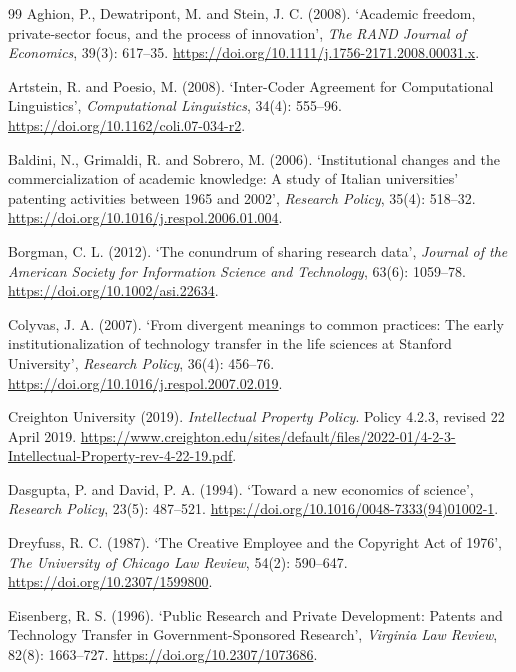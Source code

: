 \begin{thebibliography}{99}
 Aghion, P., Dewatripont, M. and Stein, J. C. (2008). `Academic freedom, private-sector focus, and the process of innovation', \emph{The RAND Journal of Economics}, 39(3): 617--35. \url{https://doi.org/10.1111/j.1756-2171.2008.00031.x}.

 Artstein, R. and Poesio, M. (2008). `Inter-Coder Agreement for Computational Linguistics', \emph{Computational Linguistics}, 34(4): 555--96. \url{https://doi.org/10.1162/coli.07-034-r2}.

 Baldini, N., Grimaldi, R. and Sobrero, M. (2006). `Institutional changes and the commercialization of academic knowledge: A study of Italian universities' patenting activities between 1965 and 2002', \emph{Research Policy}, 35(4): 518--32. \url{https://doi.org/10.1016/j.respol.2006.01.004}.

 Borgman, C. L. (2012). `The conundrum of sharing research data', \emph{Journal of the American Society for Information Science and Technology}, 63(6): 1059--78. \url{https://doi.org/10.1002/asi.22634}.

 Colyvas, J. A. (2007). `From divergent meanings to common practices: The early institutionalization of technology transfer in the life sciences at Stanford University', \emph{Research Policy}, 36(4): 456--76. \url{https://doi.org/10.1016/j.respol.2007.02.019}.

 Creighton University (2019). \emph{Intellectual Property Policy}. Policy 4.2.3, revised 22 April 2019. \url{https://www.creighton.edu/sites/default/files/2022-01/4-2-3-Intellectual-Property-rev-4-22-19.pdf}.

 Dasgupta, P. and David, P. A. (1994). `Toward a new economics of science', \emph{Research Policy}, 23(5): 487--521. \url{https://doi.org/10.1016/0048-7333(94)01002-1}.

 Dreyfuss, R. C. (1987). `The Creative Employee and the Copyright Act of 1976', \emph{The University of Chicago Law Review}, 54(2): 590--647. \url{https://doi.org/10.2307/1599800}.

 Eisenberg, R. S. (1996). `Public Research and Private Development: Patents and Technology Transfer in Government-Sponsored Research', \emph{Virginia Law Review}, 82(8): 1663--727. \url{https://doi.org/10.2307/1073686}.


\end{thebibliography}
